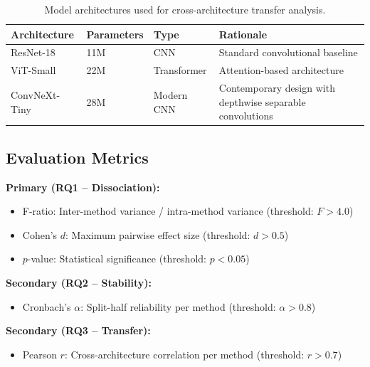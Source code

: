 \begin{table}[h]
\centering
\begin{tabular}{@{}llll@{}}
\toprule
Architecture & Parameters & Type & Rationale \\
\midrule
ResNet-18 & 11M & CNN & Standard convolutional baseline \\
ViT-Small & 22M & Transformer & Attention-based architecture \\
ConvNeXt-Tiny & 28M & Modern CNN & Contemporary design with depthwise separable convolutions \\
\bottomrule
\end{tabular}
\caption{Model architectures used for cross-architecture transfer analysis.}
\label{tab:models}
\end{table}

\subsection{Evaluation Metrics}

\textbf{Primary (RQ1 -- Dissociation):}
\begin{itemize}
\item F-ratio: Inter-method variance / intra-method variance (threshold: $F > 4.0$)
\item Cohen's $d$: Maximum pairwise effect size (threshold: $d > 0.5$)
\item $p$-value: Statistical significance (threshold: $p < 0.05$)
\end{itemize}

\textbf{Secondary (RQ2 -- Stability):}
\begin{itemize}
\item Cronbach's $\alpha$: Split-half reliability per method (threshold: $\alpha > 0.8$)
\end{itemize}

\textbf{Secondary (RQ3 -- Transfer):}
\begin{itemize}
\item Pearson $r$: Cross-architecture correlation per method (threshold: $r > 0.7$)
\end{itemize}

